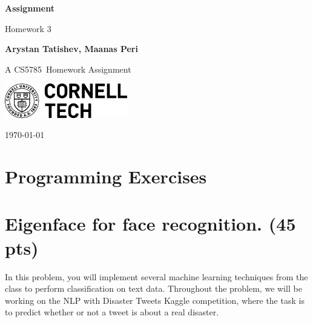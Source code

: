 \documentclass[10pt, a4paper]{article}
\newcommand\course{CS5785}                            %
\newcommand\hwnumber{3}                                 %
\newcommand\Information{Arystan Tatishev, Maanas Peri}                        %
\begin{document}
\begin{titlepage}
    \begin{center}
        \vspace*{3cm}
            
        \Huge
        \textbf{Assignment}
            
        \vspace{1cm}
        \huge
        Homework \hwnumber
            
        \vspace{1.5cm}
        \Large
            
        \textbf{\Information}                      %
        
            
        \vfill
        
        A \course \ Homework Assignment
            
        \vspace{1cm}
            
        \includegraphics[width=0.4\textwidth]{logo-ct.png}
        \\
        
        \Large
        
        \today
            
    \end{center}
\end{titlepage}

\newpage
\section*{Programming Exercises}
\section{Eigenface for face recognition. (45 pts)}
In this problem, you will implement several machine learning techniques from the class to perform classification on text data. Throughout the problem, we will be working on the NLP with Disaster Tweets Kaggle competition, where the task is to predict whether or not a tweet is about a real disaster.
\end{document}
